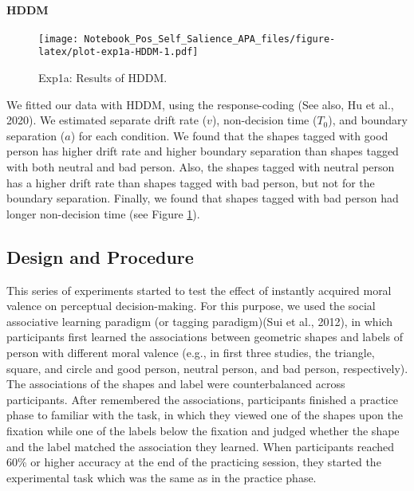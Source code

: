 \documentclass[
  english,
  man]{apa6}
\let\oldparagraph\paragraph
\renewcommand{\paragraph}[1]{\oldparagraph{#1}\mbox{}}
\begin{document}
\hypertarget{hddm}{%
\paragraph{HDDM}\label{hddm}}

\begin{figure}
\centering
\texttt{[image: Notebook\_Pos\_Self\_Salience\_APA\_files/figure-latex/plot-exp1a-HDDM-1.pdf]}
\caption{\label{fig:plot-exp1a-HDDM}Exp1a: Results of HDDM.}
\end{figure}

We fitted our data with HDDM, using the response-coding (See also, Hu et al., 2020). We estimated separate drift rate (\(v\)), non-decision time (\(T_{0}\)), and boundary separation (\(a\)) for each condition. We found that the shapes tagged with good person has higher drift rate and higher boundary separation than shapes tagged with both neutral and bad person. Also, the shapes tagged with neutral person has a higher drift rate than shapes tagged with bad person, but not for the boundary separation. Finally, we found that shapes tagged with bad person had longer non-decision time (see Figure \ref{fig:plot-exp1a-HDDM}).

\hypertarget{design-and-procedure}{%
\subsection{Design and Procedure}\label{design-and-procedure}}

This series of experiments started to test the effect of instantly acquired moral valence on perceptual decision-making. For this purpose, we used the social associative learning paradigm (or tagging paradigm)(Sui et al., 2012), in which participants first learned the associations between geometric shapes and labels of person with different moral valence (e.g., in first three studies, the triangle, square, and circle and good person, neutral person, and bad person, respectively). The associations of the shapes and label were counterbalanced across participants. After remembered the associations, participants finished a practice phase to familiar with the task, in which they viewed one of the shapes upon the fixation while one of the labels below the fixation and judged whether the shape and the label matched the association they learned. When participants reached 60\% or higher accuracy at the end of the practicing session, they started the experimental task which was the same as in the practice phase.
\end{document}
